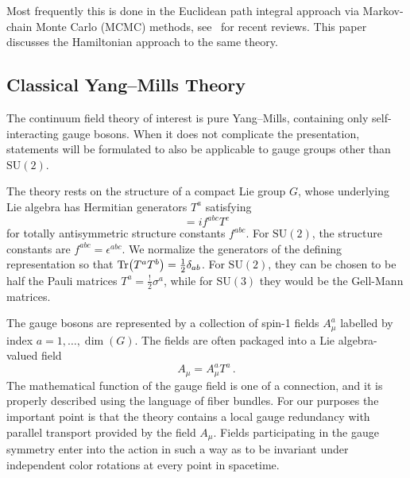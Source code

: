 \documentclass[reprint,superscriptaddress,pra,nofootinbib,preprintnumbers,floatfix]{revtex4-1}
\providecommand{\sutwo}{$\mathrm{SU}(2)$\xspace}
\providecommand{\suthree}{$\mathrm{SU}(3)$\xspace}
\begin{document}
Most frequently this is done in the Euclidean path integral approach via Markov-chain Monte Carlo (MCMC) methods, see~\cite{FlavourLatticeAveragingGroupFLAG:2021npn,Davoudi:2022bnl,USQCD:2022mmc,Davoudi:2020ngi} for recent reviews. 
%
This paper discusses the Hamiltonian approach to the same theory. 



\subsection{Classical Yang--Mills Theory}

The continuum field theory of interest is pure Yang--Mills, containing only self-interacting gauge bosons. 
%
When it does not complicate the presentation, statements will be formulated to also be applicable to gauge groups other than \sutwo. 


The theory rests on the structure of a compact Lie group $G$, whose underlying Lie algebra has Hermitian generators $T^a$ satisfying
%
\begin{equation}
    [T^a, T^b] = if^{abc} T^c
\end{equation}
%
for totally antisymmetric structure constants $f^{abc}$. 
%
For \sutwo, the structure constants are $f^{abc} = \epsilon^{abc}$. 
%
We normalize the generators of the defining representation so that $\Tr(T^a T^b) = \frac{1}{2} \delta_{ab}$. 
%
For \sutwo, they can be chosen to be half the Pauli matrices $T^a = \frac{!}{2}\sigma^a$, while for \suthree they would be the Gell-Mann matrices.



The gauge bosons are represented by a collection of spin-1 fields $A_\mu^a$ labelled by index $a = 1,\dotsc, \dim(G)$. 
%
The fields are often packaged into a Lie algebra-valued field
%
\begin{equation}
    A_\mu = A_\mu^a T^a \,.
\end{equation}
%
The mathematical function of the gauge field is one of a connection, and it is properly described using the language of fiber bundles. 
%
For our purposes the important point is that the theory contains a local gauge redundancy with parallel transport provided by the field $A_\mu$. 
%
Fields participating in the gauge symmetry enter into the action in such a way as to be invariant under independent color rotations at every point in spacetime. 
\end{document}
